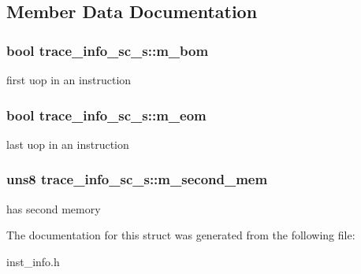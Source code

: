 \subsection{Member Data Documentation}
\hypertarget{structtrace__info__sc__s_a0e15f565c3a432b13a5920e94fbea02c}{
\subsubsection[{m\_\-bom}]{\setlength{\rightskip}{0pt plus 5cm}bool {\bf trace\_\-info\_\-sc\_\-s::m\_\-bom}}}
\label{structtrace__info__sc__s_a0e15f565c3a432b13a5920e94fbea02c}
first uop in an instruction \hypertarget{structtrace__info__sc__s_ac298237d1c88fdc18dd4a703b83a426f}{
\subsubsection[{m\_\-eom}]{\setlength{\rightskip}{0pt plus 5cm}bool {\bf trace\_\-info\_\-sc\_\-s::m\_\-eom}}}
\label{structtrace__info__sc__s_ac298237d1c88fdc18dd4a703b83a426f}
last uop in an instruction \hypertarget{structtrace__info__sc__s_ab381d88d668a12004bf60dbf73bbc3a3}{
\subsubsection[{m\_\-second\_\-mem}]{\setlength{\rightskip}{0pt plus 5cm}uns8 {\bf trace\_\-info\_\-sc\_\-s::m\_\-second\_\-mem}}}
\label{structtrace__info__sc__s_ab381d88d668a12004bf60dbf73bbc3a3}
has second memory 

The documentation for this struct was generated from the following file:\begin{DoxyCompactItemize}
\item 
inst\_\-info.h\end{DoxyCompactItemize}
